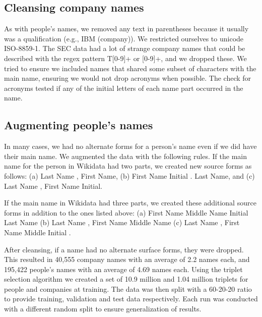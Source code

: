 \subsection{Cleansing company names}
As with people's names, we removed any text in parentheses because it usually was a qualification (e.g., IBM (company)).  We restricted ourselves to unicode ISO-8859-1.  The SEC data had a lot of strange company names that could be described with the regex pattern T[0-9]+ or [0-9]+, and we dropped these.  We tried to ensure we included names that shared some subset of characters with the main name, ensuring we would not drop acronyms when possible.  The check for acronyms tested if any of the initial letters of each name part occurred in the name.

\subsection{Augmenting people's names}
In many cases, we had no alternate forms for a person's name even if we did have their main name.  We augmented the data with the following rules.  If the main name for the person in Wikidata had two parts, we created new source forms as follows: (a) Last Name , First Name, (b) First Name Initial . Last Name, and (c) Last Name , First Name Initial.

If the main name in Wikidata had three parts, we created these additional source forms in addition to the ones listed above: (a) First Name Middle Name Initial Last Name (b) Last Name , First Name Middle Name (c) Last Name , First Name Middle Initial .

After cleansing, if a name had no alternate surface forms, they were dropped.  This resulted in 40,555 company names with an average of 2.2 names each, and 195,422 people's names with an average of 4.69 names each.  Using the triplet selection algorithm we created a set of 10.9 million and 1.04 million triplets for people and companies at training.  The data was then split with a 60-20-20 ratio to provide training, validation and test data respectively.  Each run was conducted with a different random split to ensure generalization of results.

